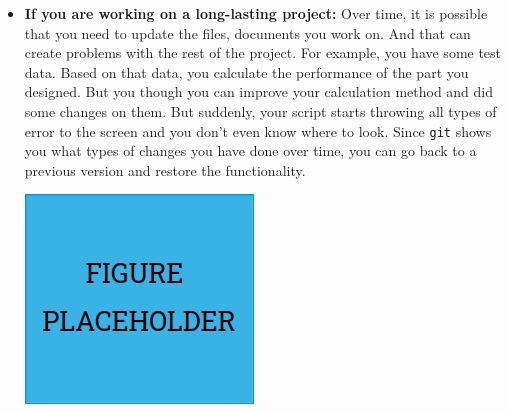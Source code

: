 \documentclass{article}
\begin{document}
        \begin{itemize}
            \item \textbf{If you are working on a long-lasting project:} Over time, it is possible that you need to update the files, documents you work on. And that can create problems with the rest of the project. For example, you have some test data. Based on that data, you calculate the performance of the part you designed. But you though you can improve your calculation method and did some changes on them. But suddenly, your script starts throwing all types of error to the screen and you don't even know where to look. Since \texttt{git} shows you what types of changes you have done over time, you can go back to a previous version and restore the functionality.\par
                \begin{minipage}{\linewidth}
                    \centering
                    \includegraphics*[scale=0.3]{./Figures/Figure_Placeholder.png}
                    \captionsetup{type=figure}
                    \label{fig:GIT_LongLastingProject}
                \end{minipage}
    

\end{itemize}
\end{document}
